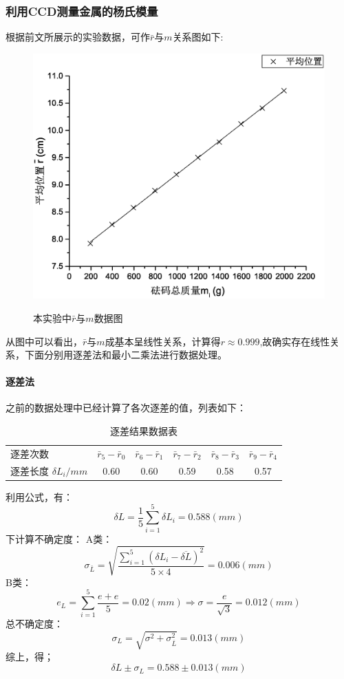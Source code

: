 \documentclass{ctexart}
\begin{document}
\subsubsection{利用CCD测量金属的杨氏模量}
根据前文所展示的实验数据，可作$\bar{r}$与$m$关系图如下:
\begin{figure}[H]
  \centering
  \caption{本实验中$\bar{r}$与$m$数据图}
  \includegraphics[width=\textwidth]{2}
  \label{fig:digit}
\end{figure}
从图中可以看出，$\bar{r}$与$m$成基本呈线性关系，计算得$r\approx 0.999$,故确实存在线性关系，下面分别用逐差法和最小二乘法进行数据处理。
\paragraph{逐差法}之前的数据处理中已经计算了各次逐差的值，列表如下：
\begin{table}[H]
  \centering
  \caption{逐差结果数据表}
    \begin{tabular}{lccccc}
    逐差次数  & \multicolumn{1}{l}{$\bar{r}_5-\bar{r}_0$} & \multicolumn{1}{l}{$\bar{r}_6-\bar{r}_1$} & \multicolumn{1}{l}{$\bar{r}_7-\bar{r}_2$} & \multicolumn{1}{l}{$\bar{r}_8-\bar{r}_3$} & \multicolumn{1}{l}{$\bar{r}_9-\bar{r}_4$} \\
    逐差长度 $\delta L_i/mm$ & 0.60  & 0.60  & 0.59  & 0.58  & 0.57  \\
    \end{tabular}%
  \label{tab:addlabel}%
\end{table}%
利用公式，有：
$$\delta L=\frac{1}5 \sum_{i=1}^5{\delta L_i}=0.588(mm)$$
下计算不确定度：
A类：$$\sigma_{\bar{L}}=\sqrt{\frac{\sum\limits_{i=1}^5{(\delta L_i-\overline{\delta L})^2}}{5\times4}}=0.006(mm)$$
B类：$$e_L=\sum\limits_{i=1}^5{\frac{e+e}5}=0.02(mm)\Rightarrow \sigma=\frac{e}{\sqrt{3}}=0.012(mm)$$
总不确定度：$$\sigma_L=\sqrt{\sigma^2+\sigma_{\bar{L}}^2}=0.013(mm)$$
综上，得；$$\delta L\pm \sigma_L=0.588\pm 0.013(mm)$$
\end{document}
